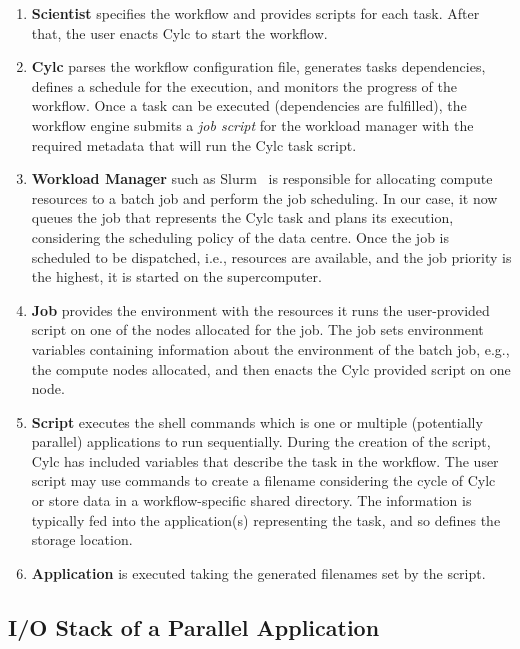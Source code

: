 \documentclass{superfri}
\begin{document}
\begin{enumerate}

  \item \textbf{Scientist} specifies the workflow and provides scripts for each task.
  After that, the user enacts Cylc to start the workflow.

  \item \textbf{Cylc} parses the workflow configuration file, generates tasks dependencies, defines a schedule for the execution, and monitors the progress of the workflow.
  Once a task can be executed (dependencies are fulfilled), the workflow engine submits a \textit{job script} for the workload manager with the required metadata that will run the Cylc task script.

  \item \textbf{Workload Manager} such as Slurm~\cite{Jette02slurm:simple} is responsible for allocating compute resources to a batch job and perform the job scheduling.
  In our case, it now queues the job that represents the Cylc task and plans its execution, considering the scheduling policy of the data centre.
  Once the job is scheduled to be dispatched, i.e., resources are available, and the job priority is the highest, it is started on the supercomputer.

  \item \textbf{Job} provides the environment with the resources it runs the user-provided script on one of the nodes allocated for the job.
  The job sets environment variables containing information about the environment of the batch job, e.g., the compute nodes allocated, and then enacts the Cylc provided script on one node.

  \item \textbf{Script} executes the shell commands which is one or multiple (potentially parallel) applications to run sequentially.
  During the creation of the script, Cylc has included variables that describe the task in the workflow.
  The user script may use commands to create a filename considering the cycle of Cylc or store data in a workflow-specific shared directory.
  The information is typically fed into the application(s) representing the task, and so defines the storage location.

  \item \textbf{Application} is executed taking the generated filenames set by the script.
\end{enumerate}

\subsection{I/O Stack of a Parallel Application}
\end{document}
